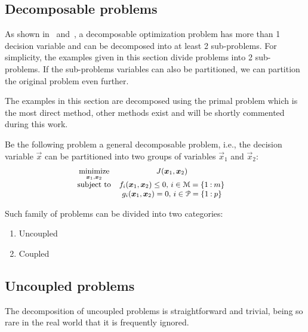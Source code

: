 \documentclass[../main.tex]{subfiles}
\begin{document}
\subsection{Decomposable problems}\label{sec:decomposable_problems}
As shown in~\cite{ConejoEtAl2006} and~\cite{BoydEtAl2015}, a decomposable optimization problem has more than 1 decision variable and can be decomposed into at least 2 sub-problems.
For simplicity, the examples given in this section divide problems into 2 sub-problems.
If the sub-problems variables can also be partitioned, we can partition the original problem even further.

The examples in this section are decomposed using the primal problem which is the most direct method, other methods exist and will be shortly commented during this work.

Be the following problem a general decomposable problem, i.e., the decision variable $\vec{x}$ can be partitioned into two groups of variables $\vec{x}_{1}$ and $\vec{x}_{2}$:
\begin{equation}\label{eq:general_decomposable_optimization_problem}
  \small
  \begin{aligned}
    \begin{matrix}
      \underset{\boldsymbol{x}_{1},\boldsymbol{x}_{2}}{\mathrm{minimize}}  &J(\boldsymbol{x}_{1},\boldsymbol{x}_{2})&\\
      \mathrm{subject~ to} &

           f_{i}(\boldsymbol{x}_{1},\boldsymbol{x}_{2}) \leq 0 \text{, } i\in\mathcal{M}=\{1\mathbin{:}m\}\\
          & g_{i}(\boldsymbol{x}_{1},\boldsymbol{x}_{2}) = 0\text{, } i\in\mathcal{P}=\{1\mathbin{:}p\}\\
    \end{matrix}
  \end{aligned}
\end{equation}

Such family of problems can be divided into two categories:
\begin{enumerate}
  \item Uncoupled
  \item Coupled
\end{enumerate}

\subsection{Uncoupled problems}\label{sec:uncoupled_problems}
The decomposition of uncoupled problems is straightforward and trivial, being so rare in the real world that it is frequently ignored.
\end{document}

